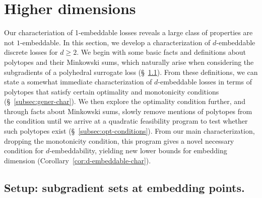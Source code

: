 \documentclass[anon]{colt2020} %
\newcommand{\reals}{\mathbb{R}}
\newcommand{\R}{\mathcal{R}}
\newcommand{\Y}{\mathcal{Y}}
\newcommand{\inprod}[2]{\langle #1, #2 \rangle}%
\begin{document}
\section{Higher dimensions}\label{sec:d-dim}

Our characteriation of 1-embeddable losses reveals a large class of properties are not $1$-embeddable.
In this section, we develop a characterization of $d$-embeddable discrete losses for $d \geq 2$.
We begin with some basic facts and definitions about polytopes and their Minkowski sums, which naturally arise when considering the subgradients of a polyhedral surrogate loss (\S~\ref{subsec:sub-sets}).
From these definitions, we can state a somewhat immediate characterization of $d$-embeddable losses in terms of polytopes that satisfy certain optimality and monotonicity conditions (\S~\ref{subsec:gener-char}).
We then explore the optimality condition further, and through facts about Minkowski sums, slowly remove mentions of polytopes from the condition until we arrive at a quadratic feasibility program to test whether such polytopes exist (\S~\ref{subsec:opt-conditions}).
From our main characterization, dropping the monotonicity condition, this program gives a novel necessary condition for $d$-embeddability, yielding new lower bounds for embedding dimension (Corollary~\ref{cor:d-embeddable-char}).

\subsection{Setup: subgradient sets at embedding points.}\label{subsec:sub-sets}
\end{document}
